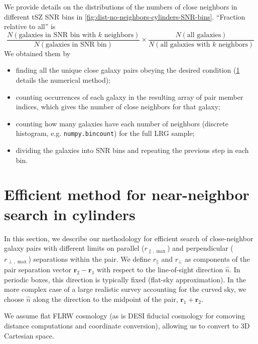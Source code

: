 We provide details on the distributions of the numbers of close neighbors in different tSZ SNR bins in \cref{fig:dist-no-neighbors-cylinders-SNR-bins}.
``Fraction relative to all'' is
\begin{equation}
    \frac{N(\text{galaxies in SNR bin with $k$ neighbors})}{N(\text{galaxies in SNR bin})} \times \frac{N(\text{all galaxies})}{N(\text{all galaxies with $k$ neighbors})} \label{eq:fraction-relative-to-all}
\end{equation}
We obtained them by
\begin{itemize}
    \item finding all the unique close galaxy pairs obeying the desired condition (\cref{sec:method-near-neighbor-search-cylinder} details the numerical method);
    \item counting occurrences of each galaxy in the resulting array of pair member indices, which gives the number of close neighbors for that galaxy;
    \item counting how many galaxies have each number of neighbors (discrete histogram, e.g. {\tt numpy.bincount}) for the full LRG sample;
    \item dividing the galaxies into SNR bins and repeating the previous step in each bin.
\end{itemize}

\section{Efficient method for near-neighbor search in cylinders}
\label{sec:method-near-neighbor-search-cylinder}

In this section, we describe our methodology for efficient search of close-neighbor galaxy pairs with different limits on parallel ($r_{\parallel,\max}$) and perpendicular ($r_{\perp,\max}$) separations within the pair.
We define $r_\parallel$ and $r_\perp$ as components of the pair separation vector $\bm{r}_2 - \bm{r}_1$ with respect to the line-of-sight direction $\hat n$.
In periodic boxes, this direction is typically fixed (flat-sky approximation).
In the more complex case of a large realistic survey accounting for the curved sky, we choose $\hat n$ along the direction to the midpoint of the pair, $\bm{r}_1 + \bm{r}_2$.

We assume flat FLRW cosmology (as is DESI fiducial cosmology for comoving distance computations and coordinate conversion), allowing us to convert to 3D Cartesian space.

